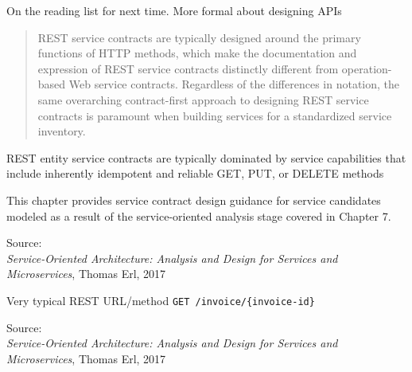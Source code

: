 \documentclass[Screen16to9,17pt]{foils}
\begin{document}

On the reading list for next time. More formal about designing APIs

\begin{quote}
REST service contracts are typically designed around the primary functions of HTTP methods, which make the documentation and expression of REST service contracts distinctly different from operation-based Web service contracts. Regardless of the differences in notation, the same overarching contract-first approach to designing REST service contracts is paramount when building services for a standardized service inventory.
\end{quote}

\begin{list2}
\item REST entity service contracts are typically dominated by service capabilities that include inherently idempotent and reliable GET, PUT, or DELETE methods
\item This chapter provides service contract design guidance for service candidates modeled as a result of the service-oriented analysis stage covered in Chapter 7.
\end{list2}
Source: {\footnotesize\\
\emph{Service‑Oriented Architecture: Analysis and Design for Services and Microservices}, Thomas Erl, 2017}





\begin{list2}
\item Very typical REST URL/method \verb+GET /invoice/{invoice-id}+
\end{list2}
Source: {\footnotesize\\
\emph{Service‑Oriented Architecture: Analysis and Design for Services and Microservices}, Thomas Erl, 2017}



\end{document}
